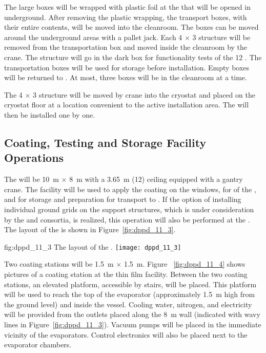 The large  boxes will be wrapped with plastic foil at the  that will be opened in  underground. After removing the plastic wrapping, the transport boxes, with their entire contents, will be moved into the cleanroom. The  boxes can be moved around the underground areas with a pallet jack. Each \num{4} $\times$ \num{3} structure will be removed from the transportation box and moved inside the cleanroom by the crane. The structure will go in the dark box for functionality tests of the \num{12} . The transportation boxes will be used for storage before installation. Empty boxes will be returned to . At most, three  boxes will be in the cleanroom at a time.

The \num{4} $\times$ \num{3} structure will be moved by crane into the cryostat and placed on the cryostat floor at a location convenient to the active installation area. The  will then be installed one by one. 

\subsection{Coating, Testing and Storage Facility Operations}
\label{subsec:dp-pds-itf}

The  will be \SI{10}{\m} $\times$ \SI{8}{\m} with a \SI{3.65}{m} (\SI{12}{\ft}) ceiling equipped with a gantry crane. The facility will be used to apply the  coating on the  windows, for  of the , and for storage and preparation for transport to \surf. If the option of installing individual ground grids on the  support structures, which is under consideration by the \dual {} and  consortia, is realized, this operation will also be performed at the . The layout of the  is shown in Figure~\ref{fig:dppd_11_3}.

\begin{dunefigure}{fig:dppd_11_3}
{The layout of the .}
\texttt{[image: dppd\_11\_3]}
\end{dunefigure}

Two coating stations will be \SI{1.5}{\m} $\times$ \SI{1.5}{\m}. Figure ~\ref{fig:dppd_11_4} shows pictures of a  coating station at the  thin film facility. Between the two coating stations, an elevated platform, accessible by stairs, will be placed. This platform will be used to reach the top of the evaporator (approximately \SI{1.5}{\m} high from the ground level) and inside the vessel. Cooling water, nitrogen, and electricity will be provided from the outlets placed along the \SI{8}{\m} wall (indicated with wavy lines in Figure~\ref{fig:dppd_11_3}). Vacuum pumps will be placed in the immediate vicinity of the evaporators. Control electronics will also be placed next to the evaporator chambers. 

